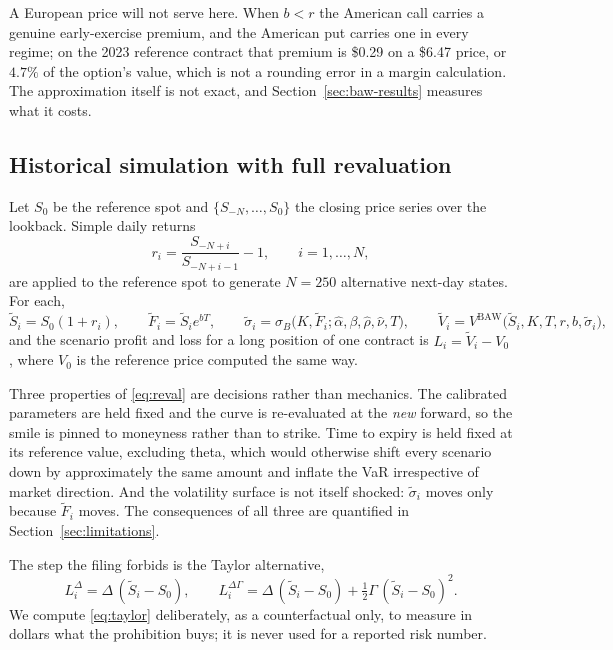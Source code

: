 \documentclass[11pt]{article}
\begin{document}
A European price will not serve here. When $b<r$ the American call carries a genuine
early-exercise premium, and the American put carries one in every regime; on the 2023
reference contract that premium is \$0.29 on a \$6.47 price, or $4.7\%$ of the option's
value, which is not a rounding error in a margin calculation. The approximation itself
is not exact, and Section~\ref{sec:baw-results} measures what it costs.

\subsection{Historical simulation with full revaluation}

Let $S_0$ be the reference spot and $\{S_{-N},\dots,S_{0}\}$ the closing price series over
the lookback. Simple daily returns
\begin{equation}
  r_i=\frac{S_{-N+i}}{S_{-N+i-1}}-1,\qquad i=1,\dots,N,
  \label{eq:returns}
\end{equation}
are applied to the reference spot to generate $N=250$ alternative next-day states. For
each,
\begin{equation}
  \tilde{S}_i = S_0(1+r_i),
  \qquad
  \tilde{F}_i = \tilde{S}_i e^{bT},
  \qquad
  \tilde{\sigma}_i = \sigma_{B}\bigl(K,\tilde{F}_i;\hat{\alpha},\beta,\hat{\rho},\hat{\nu},T\bigr),
  \qquad
  \tilde{V}_i = V^{\mathrm{BAW}}\bigl(\tilde{S}_i,K,T,r,b,\tilde{\sigma}_i\bigr),
  \label{eq:reval}
\end{equation}
and the scenario profit and loss for a long position of one contract is
$L_i=\tilde{V}_i-V_0$, where $V_0$ is the reference price computed the same way.

Three properties of \eqref{eq:reval} are decisions rather than mechanics. The calibrated
parameters are held fixed and the curve is re-evaluated at the \emph{new} forward, so
the smile is pinned to moneyness rather than to strike. Time to expiry is held fixed at
its reference value, excluding theta, which would otherwise shift every scenario down by
approximately the same amount and inflate the VaR irrespective of market direction. And
the volatility surface is not itself shocked: $\tilde{\sigma}_i$ moves only because
$\tilde{F}_i$ moves. The consequences of all three are quantified in
Section~\ref{sec:limitations}.

The step the filing forbids is the Taylor alternative,
\begin{equation}
  L_i^{\Delta}=\Delta\,(\tilde{S}_i-S_0),
  \qquad
  L_i^{\Delta\Gamma}=\Delta\,(\tilde{S}_i-S_0)+\tfrac{1}{2}\Gamma\,(\tilde{S}_i-S_0)^{2}.
  \label{eq:taylor}
\end{equation}
We compute \eqref{eq:taylor} deliberately, as a counterfactual only, to measure in
dollars what the prohibition buys; it is never used for a reported risk number.
\end{document}
